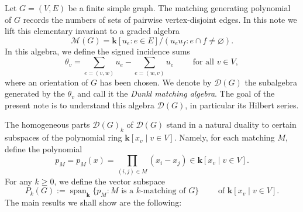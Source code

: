\documentclass[12pt]{amsart}
\theoremstyle{definition}
\theoremstyle{remark}
\newcommand{\kk}{\mathbf{k}}
\newcommand{\Span}{\operatorname{span}}
\begin{document}
Let $G=(V,E)$ be a finite simple graph.  The matching generating polynomial
of $G$ records the numbers of sets of pairwise vertex-disjoint edges.  In this
note we lift this elementary invariant to a graded algebra
\[
  \mathcal M(G)=\kk[u_e:e\in E]/(u_eu_f:e\cap f\ne\varnothing).
\]
In this algebra, we define the signed incidence sums
\[
  \theta_v=\sum_{e=(v,w)}u_e-\sum_{e=(w,v)}u_e
  \qquad \text{ for all } v \in V,
\]
where an orientation of $G$ has been chosen.  We denote by $\mathcal D(G)$
the subalgebra generated by the $\theta_v$ and call it the \emph{Dunkl
matching algebra}.
The goal of the present note is to understand this algebra
$\mathcal D(G)$, in particular its Hilbert series.

The homogeneous parts $\mathcal D(G)_k$ of $\mathcal D(G)$
stand in a natural duality to certain subspaces of the polynomial ring
$\kk[x_v \mid  v\in V]$.
Namely, for each matching $M$, define the polynomial
\[
  p_M = p_M(x)=\prod_{(i,j) \in M}(x_i-x_j) \in \kk[x_v \mid  v\in V].
\]
For any $k \geq 0$, we define the vector subspace
\[
  P_k(G):=\Span_\kk\{p_M:M\text{ is a $k$-matching of $G$}\}
  \qquad \text{ of } \kk[x_v \mid  v\in V].
\]
The main results we shall show are the following:
\end{document}
